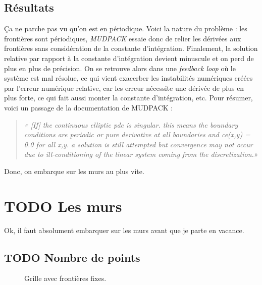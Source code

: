 \documentclass[10pt]{article}
\numberwithin{equation}{section}
\begin{document}
\subsection{Résultats}
\label{sec:orgfa6675a}
Ça ne parche pas vu qu'on est en périodique.
Voici la nature du problème : les frontières sont périodiques, \emph{MUDPACK} essaie donc de relier les dérivées aux frontières sans considération de la constante d'intégration.
Finalement, la solution relative par rapport à la constante d'intégration devient minuscule et on perd de plus en plus de précision.
On se retrouve alors dans une \emph{feedback loop} où le système est mal résolue, ce qui vient exacerber les instabilités numériques créées par l'erreur numérique relative, car les erreur nécessite une dérivée de plus en plus forte, ce qui fait aussi monter la constante d'intégration, etc.
Pour résumer, voici un passage de la documentation de MUDPACK :

\begin{quote}
\emph{« [If] the continuous elliptic pde is singular.  this means the boundary conditions are periodic or pure derivative at all boundaries and ce(x,y) = 0.0 for all x,y.  a solution is still attempted but convergence may not occur due to ill-conditioning of the linear system coming from the discretization.»}
\end{quote}

Donc, on embarque sur les murs au plus vite.
\section{{\bfseries\sffamily TODO} Les murs}
\label{sec:orgb543960}
Ok, il faut absolument embarquer sur les murs avant que je parte en vacance.
\subsection{{\bfseries\sffamily TODO} Nombre de points}
\label{sec:org84ad660}

\begin{figure}
\vspace{-\baselineskip}
\begin{center}
\end{center}
\caption{\label{org39311c1}Grille  avec frontières fixes.}
\end{figure}
\end{document}
